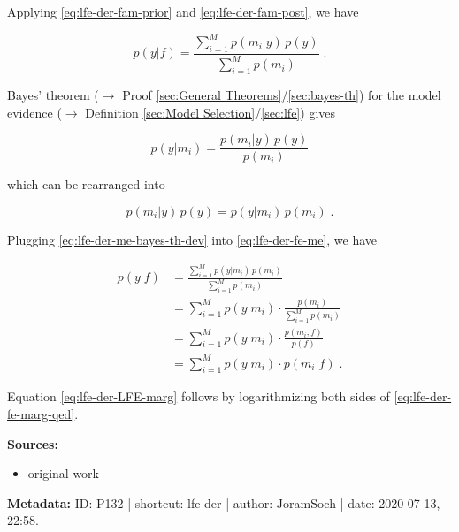 \documentclass[a4paper,12pt,twoside]{book}
\begin{document}
Applying \eqref{eq:lfe-der-fam-prior} and \eqref{eq:lfe-der-fam-post}, we have

\begin{equation} \label{eq:lfe-der-fe-me}
p(y|f) = \frac{\sum_{i=1}^M p(m_i|y) \, p(y)}{\sum_{i=1}^M p(m_i)} \; .
\end{equation}

Bayes' theorem ($\rightarrow$ Proof \ref{sec:General Theorems}/\ref{sec:bayes-th}) for the model evidence ($\rightarrow$ Definition \ref{sec:Model Selection}/\ref{sec:lfe}) gives

\begin{equation} \label{eq:lfe-der-me-bayes-th}
p(y|m_i) = \frac{p(m_i|y) \, p(y)}{p(m_i)}
\end{equation}

which can be rearranged into

\begin{equation} \label{eq:lfe-der-me-bayes-th-dev}
p(m_i|y) \, p(y) = p(y|m_i) \, p(m_i) \; .
\end{equation}

Plugging \eqref{eq:lfe-der-me-bayes-th-dev} into \eqref{eq:lfe-der-fe-me}, we have

\begin{equation} \label{eq:lfe-der-fe-marg-qed}
\begin{split}
p(y|f) &= \frac{\sum_{i=1}^M p(y|m_i) \, p(m_i)}{\sum_{i=1}^M p(m_i)} \\
&= \sum_{i=1}^M p(y|m_i) \cdot \frac{p(m_i)}{\sum_{i=1}^M p(m_i)} \\
&= \sum_{i=1}^M p(y|m_i) \cdot \frac{p(m_i,f)}{p(f)} \\
&= \sum_{i=1}^M p(y|m_i) \cdot p(m_i|f) \; .
\end{split}
\end{equation}

Equation \eqref{eq:lfe-der-LFE-marg} follows by logarithmizing both sides of \eqref{eq:lfe-der-fe-marg-qed}.


\vspace{1em}
\textbf{Sources:}
\begin{itemize}
\item original work\end{itemize}


\vspace{1em}
\textbf{Metadata:} ID: P132 | shortcut: lfe-der | author: JoramSoch | date: 2020-07-13, 22:58.
\vspace{1em}
\end{document}
